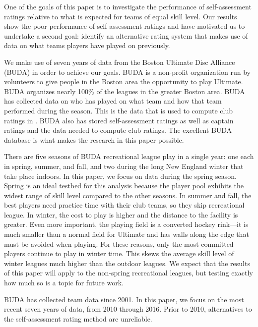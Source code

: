 One of the goals of this paper is to investigate the performance of self-assessment ratings relative to what is expected for teams of equal skill level.  Our results show the poor performance of self-assessment ratings and have motivated us to undertake a second goal: identify an alternative rating system that makes use of data on what teams players have played on previously. 

We make use of seven years of data from the Boston Ultimate Disc Alliance (BUDA) in order to achieve our goals. BUDA is a non-profit organization run by volunteers to give people in the Boston area the opportunity to play Ultimate. BUDA organizes nearly 100\% of the leagues in the greater Boston area. BUDA has collected data on who has played on what team and how that team performed during the season.  This is the data that is used to compute club ratings in .  BUDA also has stored self-assessment ratings as well as captain ratings and the data needed to compute club ratings.  The excellent BUDA database is what makes the research in this paper possible.  

There are five seasons of BUDA recreational league play in a single year: one each in spring, summer, and fall, and two during the long New England winter that take place indoors. In this paper, we focus on data during the spring season.  Spring is an ideal testbed for this analysis because the player pool exhibits the widest range of skill level compared to the other seasons.  In summer and fall, the best players need practice time with their club teams, so they skip recreational league.  In winter, the cost to play is higher and the distance to the facility is greater.  Even more important, the playing field is a converted hockey rink---it is much smaller than a normal field for Ultimate and has walls along the edge that must be avoided when playing.  For these reasons, only the most committed players continue to play in winter time. This skews the average skill level of winter leagues much higher than the outdoor leagues.  We expect that the results of this paper will apply to the non-spring recreational leagues, but testing exactly how much so is a topic for future work.

BUDA has collected team data since 2001. In this paper, we focus on the most recent seven years of data, from 2010 through 2016.  Prior to 2010, alternatives to the self-assessment rating method are unreliable.